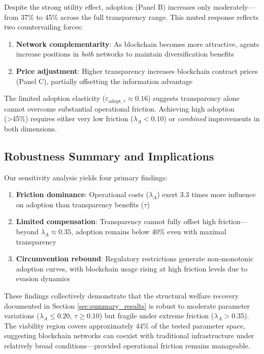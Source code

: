 Despite the strong utility effect, adoption (Panel B) increases only 
moderately—from 37\% to 45\% across the full transparency range. This 
muted response reflects two countervailing forces:

\begin{enumerate}
    \item \textbf{Network complementarity}: As blockchain becomes more 
    attractive, agents increase positions in \textit{both} networks to 
    maintain diversification benefits
    
    \item \textbf{Price adjustment}: Higher transparency increases 
    blockchain contract prices (Panel C), partially offsetting the 
    information advantage
\end{enumerate}

The limited adoption elasticity ($\varepsilon_{\text{adopt},\tau} \approx 0.16$) 
suggests transparency alone cannot overcome substantial operational friction. 
Achieving high adoption (>45\%) requires either very low friction 
($\lambda_A < 0.10$) or \textit{combined} improvements in both dimensions.

\subsection{Robustness Summary and Implications}

Our sensitivity analysis yields four primary findings:

\begin{enumerate}
    \item \textbf{Friction dominance}: Operational costs ($\lambda_A$) exert 
    3.3 times more influence on adoption than transparency benefits ($\tau$)
    
    \item \textbf{Limited compensation}: Transparency cannot fully offset 
    high friction—beyond $\lambda_A \approx 0.35$, adoption remains below 
    40\% even with maximal transparency
    
    
    \item \textbf{Circumvention rebound}: Regulatory restrictions generate 
    non-monotonic adoption curves, with blockchain usage rising at high 
    friction levels due to evasion dynamics
\end{enumerate}

These findings collectively demonstrate that the structural welfare recovery 
documented in Section \ref{sec:summary_results} is robust to moderate 
parameter variations ($\lambda_A \leq 0.20$, $\tau \geq 0.10$) but 
fragile under extreme friction ($\lambda_A > 0.35$). The viability 
region covers approximately 44\% of the tested parameter space, suggesting 
blockchain networks can coexist with traditional infrastructure under 
relatively broad conditions—provided operational friction remains manageable.

